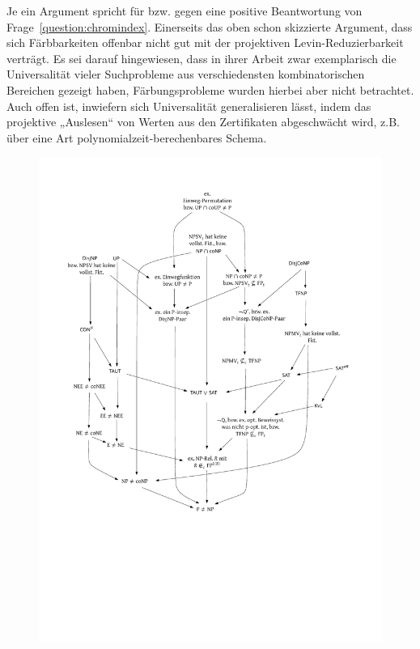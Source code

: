 Je ein Argument spricht für bzw. gegen eine positive Beantwortung von Frage~\ref{question:chromindex}.
Einerseits das oben schon skizzierte Argument, dass sich Färbbarkeiten offenbar nicht gut mit der projektiven Levin-Reduzierbarkeit verträgt.  Es sei darauf hingewiesen, dass \textcite{agrawal_universal_1992} in ihrer Arbeit zwar exemplarisch die Universalität vieler Suchprobleme aus verschiedensten kombinatorischen Bereichen gezeigt haben, Färbungsprobleme wurden hierbei aber nicht betrachtet. 
Auch offen ist, inwiefern sich Universalität generalisieren lässt, indem das projektive „Auslesen“ von Werten aus den Zertifikaten abgeschwächt wird, z.B. über eine Art polynomialzeit-berechenbares Schema.

\begin{figure}[t]
    \begin{minipage}[t][7.9cm][t]{\textwidth}
    \centering\includegraphics[page=6]{figures.pdf}

\end{minipage}
\end{figure}
